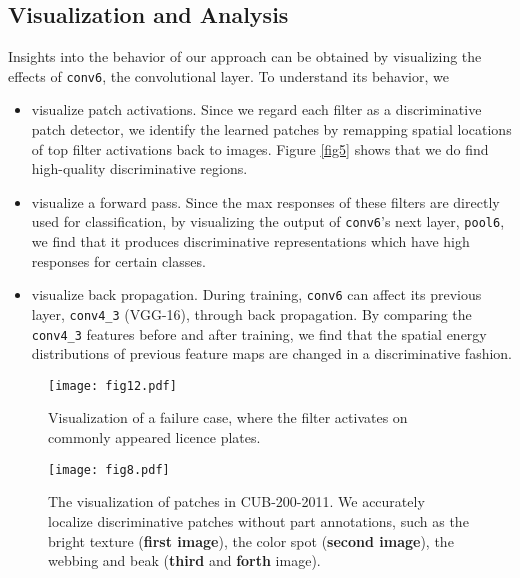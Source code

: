 \documentclass[10pt,twocolumn,letterpaper]{article}
\begin{document}
\subsection{Visualization and Analysis} \label{sec4_4}
Insights into the behavior of our approach can be obtained by visualizing the effects of \texttt{conv6}, the  convolutional layer. To 
understand its behavior, we
\begin{itemize}[noitemsep, topsep=0pt]
\item visualize patch activations. Since we regard each filter as a discriminative patch detector, we identify
the learned patches by remapping spatial locations of top filter activations back to images. Figure \ref{fig5} shows
that we do find high-quality discriminative regions.
\item visualize a forward pass. Since the max responses of these filters are directly used for
classification, by visualizing the output of \texttt{conv6}'s next layer, \texttt{pool6}, we find that it
produces discriminative representations which have high responses for certain classes.
\item visualize back propagation. During training, \texttt{conv6} can affect its previous layer, \texttt{conv4\_3}
(VGG-16), through back propagation. By comparing the \texttt{conv4\_3} features before and after training, we find that the
spatial energy distributions of previous feature maps are changed in a discriminative fashion. 
\end{itemize}
\begin{figure}
\begin{center}
\texttt{[image: fig12.pdf]}
\end{center}
   \vspace{-10pt}
   \caption{\label{fig12} Visualization of a failure case, where the filter activates on commonly appeared licence plates.}
   \vspace{-10pt}
\end{figure}

\begin{figure}
\begin{center}
\texttt{[image: fig8.pdf]}
\end{center}
   \vspace{-10pt}
   \caption{\label{fig8} The visualization of patches in CUB-200-2011. We accurately
   localize discriminative patches without part annotations, such as the bright texture (\textbf{first image}), the color spot 
   (\textbf{second image}), the webbing and beak (\textbf{third} and \textbf{forth} image).}
   \vspace{-10pt}
\end{figure}
\end{document}
